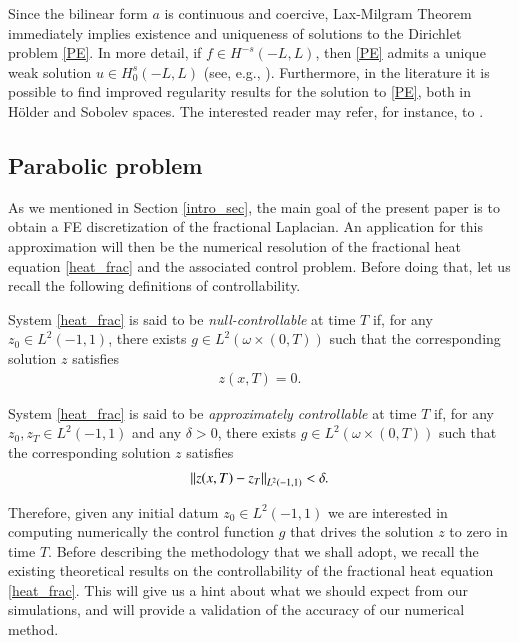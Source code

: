 Since the bilinear form $a$ is continuous and coercive, Lax-Milgram Theorem immediately implies existence and uniqueness of solutions to the Dirichlet problem \eqref{PE}. In more detail, if $f\in H^{-s}(-L,L)$, then \eqref{PE} admits a unique weak solution $u\in H_0^s(-L,L)$ (see, e.g., \cite[Proposition 2.1]{biccari2017local}). Furthermore, in the literature it is possible to find improved regularity results for the solution to \eqref{PE}, both in H\"older and Sobolev spaces. The interested reader may refer, for instance, to \cite{acosta2017fractional,biccari2017local,leonori2015basic,ros2014dirichlet,ros2014extremal}.

\subsection{Parabolic problem}

As we mentioned in Section \ref{intro_sec}, the main goal of the present paper is to obtain a FE discretization of the fractional Laplacian. An application for this approximation will then be the numerical resolution of the fractional heat equation \eqref{heat_frac} and the associated control problem. Before doing that, let us recall the following definitions of controllability.

\begin{definition}
System \eqref{heat_frac} is said to be \textit{null-controllable} at time $T$ if, for any $z_0\in L^2(-1,1)$, there exists $g\in L^2(\omega\times(0,T))$ such that the corresponding solution $z$ satisfies 
\begin{align*}
	z(x,T)=0.
\end{align*}

\end{definition}

\begin{definition}
System \eqref{heat_frac} is said to be \textit{approximately controllable} at time $T$ if, for any $z_0,z_T\in L^2(-1,1)$ and any $\delta>0$, there exists $g\in L^2(\omega\times(0,T))$ such that the corresponding solution $z$ satisfies \begin{align*}
	{\left\|z(x,T)-z_T\right\|}_{L^2(-1,1)}<\delta.
\end{align*}
\end{definition}

Therefore, given any initial datum $z_0\in L^2(-1,1)$ we are interested in computing numerically the control function $g$ that drives the solution $z$ to zero in time $T$. Before describing the methodology that we shall adopt, we recall the existing theoretical results on the controllability of the fractional heat equation \eqref{heat_frac}. This will give us a hint about what we should expect from our simulations, and will provide a validation of the accuracy of our numerical method.

